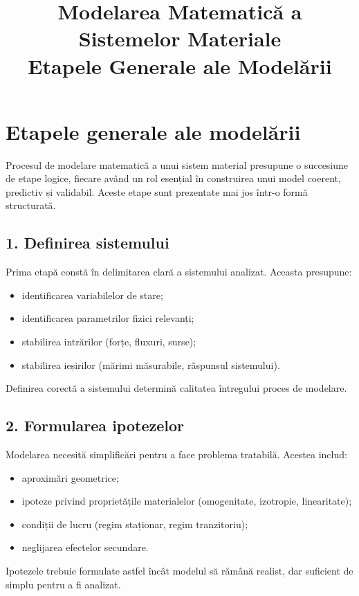 \documentclass[12pt,a4paper]{article}
\title{Modelarea Matematică a Sistemelor Materiale \\ \large Etapele Generale ale Modelării}
\author{}
\date{}
\begin{document}
\maketitle

\section{Etapele generale ale modelării}

Procesul de modelare matematică a unui sistem material presupune o succesiune de etape logice, fiecare având un rol esențial în construirea unui model coerent, predictiv și validabil. Aceste etape sunt prezentate mai jos într-o formă structurată.

\subsection{1. Definirea sistemului}

Prima etapă constă în delimitarea clară a sistemului analizat. Aceasta presupune:
\begin{itemize}
    \item identificarea variabilelor de stare;
    \item identificarea parametrilor fizici relevanți;
    \item stabilirea intrărilor (forțe, fluxuri, surse);
    \item stabilirea ieșirilor (mărimi măsurabile, răspunsul sistemului).
\end{itemize}

Definirea corectă a sistemului determină calitatea întregului proces de modelare.

\subsection{2. Formularea ipotezelor}

Modelarea necesită simplificări pentru a face problema tratabilă. Acestea includ:
\begin{itemize}
    \item aproximări geometrice;
    \item ipoteze privind proprietățile materialelor (omogenitate, izotropie, linearitate);
    \item condiții de lucru (regim staționar, regim tranzitoriu);
    \item neglijarea efectelor secundare.
\end{itemize}

Ipotezele trebuie formulate astfel încât modelul să rămână realist, dar suficient de simplu pentru a fi analizat.
\end{document}
